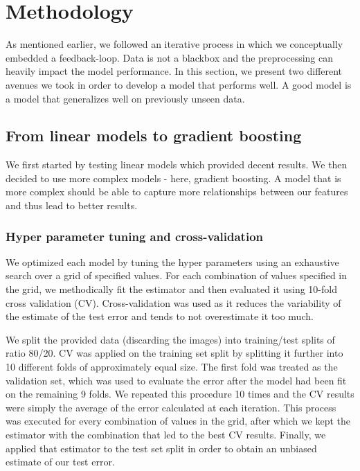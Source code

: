 \documentclass[sigplan,screen]{acmart}
\begin{document}
\section{Methodology}
As mentioned earlier, we followed an iterative process in which we conceptually embedded a feedback-loop. Data is not a blackbox and the preprocessing can heavily impact the model performance. In this section, we present two different avenues we took in order to develop a model that performs well. A good model is a model that generalizes well on previously unseen data.

\subsection{From linear models to gradient boosting}
We first started by testing linear models which provided decent results.
We then decided to use more complex models - here, gradient boosting.  A model that is more complex should be able to capture more relationships between our features and thus lead to better results.  

\subsubsection{Hyper parameter tuning and cross-validation}
We optimized each model by tuning the hyper parameters using an exhaustive search over a grid of specified values. For each combination of values specified in the grid, we methodically fit the estimator and then evaluated it using 10-fold cross validation (CV). Cross-validation was used as it reduces the variability of the estimate of the test error and tends to not overestimate it too much. 

We split the provided data (discarding the images) into training/test splits of ratio 80/20. CV was applied on the training set split by splitting it further into 10 different folds of approximately equal size. The first fold was treated as the validation set, which was used to evaluate the error after the model had been fit on the remaining 9 folds. We repeated this procedure 10 times and the CV results were simply the average of the error calculated at each iteration. This process was executed for every combination of values in the grid, after which we kept the estimator with the combination that led to the best CV results. Finally, we applied that estimator to the test set split in order to obtain an unbiased estimate of our test error.
\end{document}
